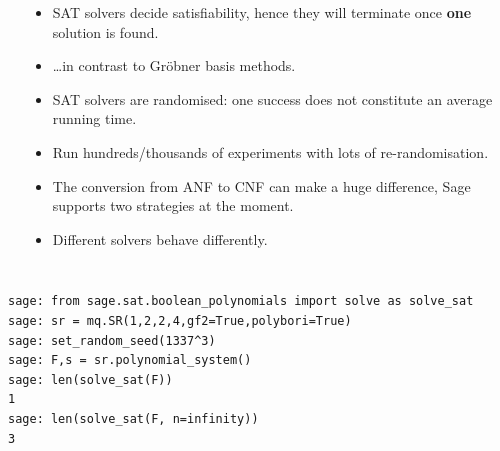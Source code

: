 \documentclass[9pt]{beamer}
\renewcommand{\emph}[1]{\textbf{\color{oxygenorange}#1}\xspace}
\begin{document}
\begin{frame}
\framebreak
\begin{columns}

\begin{algorithm}[H]
\end{algorithm}
 
\begin{itemize}
 \item SAT solvers decide satisfiability, hence they will terminate once \emph{one} solution is found.
 \item \dots in contrast to Gröbner basis methods.
 \item SAT solvers are randomised: one success does not constitute an average running time.
 \item Run hundreds/thousands of experiments with lots of re-randomisation.
 \item The conversion from ANF to CNF can make a huge difference, Sage supports two strategies at the moment.
 \item Different solvers behave differently.
\end{itemize}
\end{columns}

\begin{lstlisting}
sage: from sage.sat.boolean_polynomials import solve as solve_sat
sage: sr = mq.SR(1,2,2,4,gf2=True,polybori=True)
sage: set_random_seed(1337^3)
sage: F,s = sr.polynomial_system()
sage: len(solve_sat(F))            
1
sage: len(solve_sat(F, n=infinity)) 
3
\end{lstlisting}
\end{frame}
\end{document}

